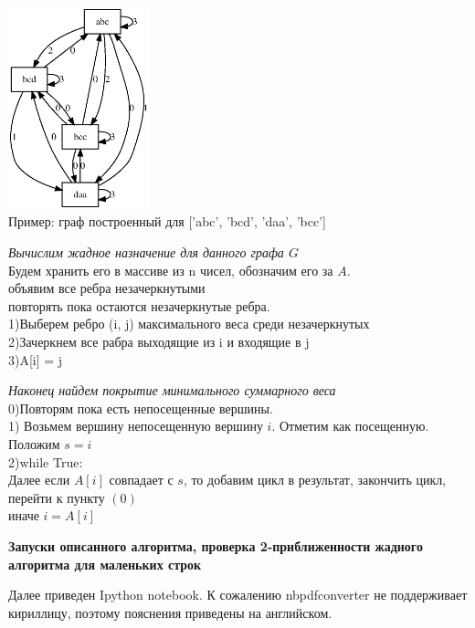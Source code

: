 \documentclass[11pt,a4paper]{article}
\begin{document}
\begin{center}
\includegraphics[width=1.6in]{pict2.eps}\\
Пример: граф построенный для ['abc', 'bcd', 'daa', 'bcc']
\end{center}
\par
\textit{Вычислим жадное назначение для данного графа $G$}
\\
Будем хранить его в массиве из n чисел, обозначим его за $A$.
\\
объявим все ребра незачеркнутыми\\
повторять пока остаются незачеркнутые ребра.\\
1)Выберем ребро (i, j) максимального веса среди незачеркнутых\\
2)Зачеркнем все рабра выходящие из i и входящие в j\\
3)A[i] = j
\par
\textit{Наконец найдем покрытие минимального суммарного веса}\\
0)Повторям пока есть непосещенные вершины.
\\
1) Возьмем вершину непосещенную вершину $i$. Отметим как посещенную. Положим $s = i$\\
2)while True:\\
Далее если $A[i]$ совпадает с $s$, то добавим цикл в результат, закончить цикл, перейти к пункту $(0)$\\
иначе $i = A[i]$
\begin{center}
\Large
\textbf{Запуски описанного алгоритма, проверка 2-приближенности жадного алгоритма для маленьких строк}
\normalsize
\end{center}
Далее приведен Ipython notebook. К сожалению nbpdfconverter не поддерживает кириллицу, поэтому пояснения приведены на английском.
\end{document}
